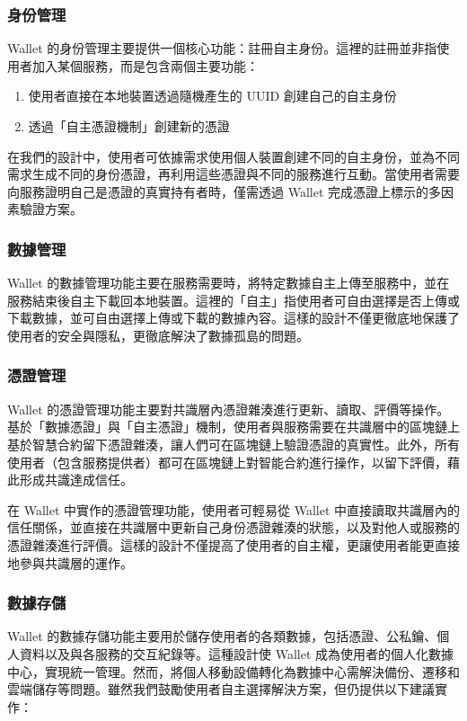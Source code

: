 \subsubsection{身份管理}
Wallet 的身份管理主要提供一個核心功能：註冊自主身份。這裡的註冊並非指使用者加入某個服務，而是包含兩個主要功能：
\begin{enumerate}
  \item 使用者直接在本地裝置透過隨機產生的 UUID 創建自己的自主身份
  \item 透過「自主憑證機制」創建新的憑證
\end{enumerate}
在我們的設計中，使用者可依據需求使用個人裝置創建不同的自主身份，並為不同需求生成不同的身份憑證，再利用這些憑證與不同的服務進行互動。當使用者需要向服務證明自己是憑證的真實持有者時，僅需透過 Wallet 完成憑證上標示的多因素驗證方案。
\subsubsection{數據管理}
Wallet 的數據管理功能主要在服務需要時，將特定數據自主上傳至服務中，並在服務結束後自主下載回本地裝置。這裡的「自主」指使用者可自由選擇是否上傳或下載數據，並可自由選擇上傳或下載的數據內容。這樣的設計不僅更徹底地保護了使用者的安全與隱私，更徹底解決了數據孤島的問題。
\subsubsection{憑證管理}
Wallet 的憑證管理功能主要對共識層內憑證雜湊進行更新、讀取、評價等操作。基於「數據憑證」與「自主憑證」機制，使用者與服務需要在共識層中的區塊鏈上基於智慧合約留下憑證雜湊，讓人們可在區塊鏈上驗證憑證的真實性。此外，所有使用者（包含服務提供者）都可在區塊鏈上對智能合約進行操作，以留下評價，藉此形成共識達成信任。

在 Wallet 中實作的憑證管理功能，使用者可輕易從 Wallet 中直接讀取共識層內的信任關係，並直接在共識層中更新自己身份憑證雜湊的狀態，以及對他人或服務的憑證雜湊進行評價。這樣的設計不僅提高了使用者的自主權，更讓使用者能更直接地參與共識層的運作。
\subsubsection{數據存儲}
Wallet 的數據存儲功能主要用於儲存使用者的各類數據，包括憑證、公私鑰、個人資料以及與各服務的交互紀錄等。這種設計使 Wallet 成為使用者的個人化數據中心，實現統一管理。然而，將個人移動設備轉化為數據中心需解決備份、遷移和雲端儲存等問題。雖然我們鼓勵使用者自主選擇解決方案，但仍提供以下建議實作：

